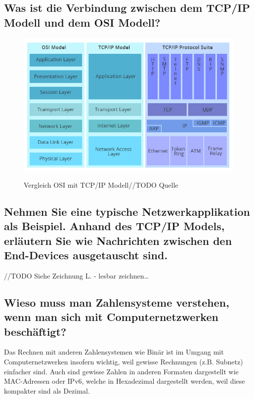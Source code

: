 \subsection*{Was ist die Verbindung zwischen dem TCP/IP Modell und dem OSI Modell?}
\begin{figure}[H]
    \begin{center}
    \label{pic:osi_tcpip}
    \includegraphics[width=\textwidth]{images/osi_tcpip.jpg}
    \caption[Vergleich OSI mit TCP/IP Modell]{Vergleich OSI mit TCP/IP Modell\footnotemark //TODO Quelle}
    \end{center}
\end{figure}

\subsection*{Nehmen Sie eine typische Netzwerkapplikation als Beispiel. Anhand des TCP/IP Models, erläutern Sie wie Nachrichten zwischen den End-Devices ausgetauscht sind.}
//TODO Siehe Zeichnung L. - lesbar zeichnen\dots

\subsection*{Wieso muss man Zahlensysteme verstehen, wenn man sich mit Computernetzwerken beschäftigt?}
Das Rechnen mit anderen Zahlensystemen wie Binär ist im Umgang mit Computernetzwerken insofern wichtig, weil gewisse Rechnungen (z.B. Subnetz) einfacher sind. Auch sind gewisse Zahlen in anderen Formaten dargestellt wie MAC-Adressen oder IPv6, welche in Hexadezimal dargestellt werden, weil diese kompakter sind als Dezimal.

